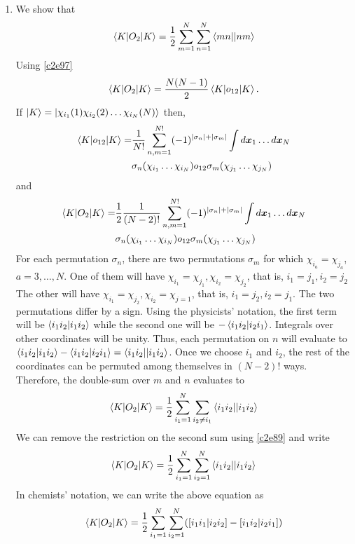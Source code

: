\begin{enumerate}
\item\label{c2r7}  We show that
\begin{equation}\label{c2e98}
\braket{K|O_2|K} = \frac{1}{2}\sum_{m=1}^N\sum_{n=1}^N\braket{mn||nm}
\end{equation}
Using \eqref{c2e97}
\[
\braket{K|O_2|K} = \frac{N(N-1)}{2}\braket{K|o_{12}|K}.
\]
If $\ket{K}=\ket{\chi_{i_1}(1)\chi_{i_2}(2)\ldots\chi_{i_N}(N)}$ then, 
\[
\begin{aligned}
\braket{K|o_{12}|K} =& \frac{1}{N!}\sum_{n,m=1}^{N!}(-1)^{|\sigma_n|+|\sigma_m|}
 \int d\bm{x}_1\ldots d\bm{x}_N \\
 &\sigma_n(\chi_{i_1}\ldots\chi_{i_N})o_{12}\sigma_m(\chi_{j_1}\ldots\chi_{j_N})
\end{aligned}
\]
and
\[
\begin{aligned}
\braket{K|O_2|K} =& \frac{1}{2}\frac{1}{(N-2)!}\sum_{n,m=1}^{N!}
    (-1)^{|\sigma_n|+|\sigma_m|} \int d\bm{x}_1\ldots d\bm{x}_N \\
 &\sigma_n(\chi_{i_1}\ldots\chi_{i_N})o_{12}\sigma_m(\chi_{j_1}\ldots\chi_{j_N})
\end{aligned}
\]
For each permutation $\sigma_n$, there are two permutations $\sigma_m$ for
which $\chi_{i_a} = \chi_{j_a}$, $a = 3, \ldots, N$. One of them will have 
$\chi_{i_1} = \chi_{j_1}, \chi_{i_2} = \chi_{j_2}$, that is, $i_1=j_1, i_2=j_2$
The other will have $\chi_{i_1} = \chi_{j_2}, \chi_{i_2} = \chi_{j=1}$, that is,
$i_1 = j_2, i_2 = j_1$. The two permutations differ by a sign. Using the 
physicists' notation, the first term will be $\braket{i_1 i_2|i_1i_2}$ while 
the second one will be $-\braket{i_1i_2|i_2i_1}$. Integrals over other 
coordinates will be unity. Thus, each permutation on $n$ will evaluate to 
$\braket{i_1i_2|i_1i_2}-\braket{i_1i_2|i_2i_1}=\braket{i_1i_2||i_1 i_2}$. Once 
we choose $i_1$ and $i_2$, the rest of the coordinates can be permuted among 
themselves in $(N-2)!$ ways. Therefore, the double-sum over $m$ and $n$ 
evaluates to
\[
\braket{K|O_2|K} = \frac{1}{2}\sum_{i_1=1}^N\sum_{i_2\ne i_1}\braket{i_1i_2||
i_1i_2}
\]
We can remove the restriction on the second sum using \eqref{c2e89} and write
\[
\braket{K|O_2|K} = \frac{1}{2}\sum_{i_1=1}^N\sum_{i_2=1}^N\braket{i_1i_2||
i_1i_2}
\]
In chemists' notation, we can write the above equation as
\[
\braket{K|O_2|K} = \frac{1}{2}\sum_{i_1=1}^N\sum_{i_2=1}^N([i_1i_1|i_2i_2] -
[i_1i_2|i_2i_1])
\]


\end{enumerate}
